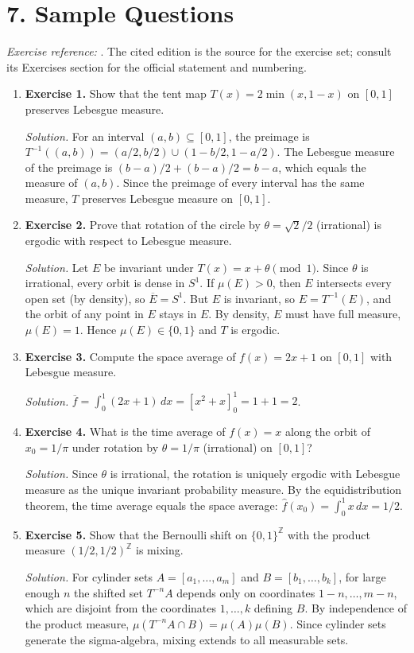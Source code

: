\section*{7. Sample Questions}
\emph{Exercise reference:} \cite{ergodic_theory_ref1}. The cited edition is the source for the exercise set; consult its Exercises section for the official statement and numbering.
\begin{enumerate}[leftmargin=*,itemsep=0.9em]

\item \textbf{Exercise 1.} Show that the tent map $T(x)=2\min(x,1-x)$ on $[0,1]$ preserves Lebesgue measure.

\emph{Solution.} For an interval $(a,b)\subseteq[0,1]$, the preimage is $T^{-1}((a,b))=(a/2,b/2)\cup(1-b/2,1-a/2)$. The Lebesgue measure of the preimage is $(b-a)/2+(b-a)/2=b-a$, which equals the measure of $(a,b)$. Since the preimage of every interval has the same measure, $T$ preserves Lebesgue measure on $[0,1]$.

\item \textbf{Exercise 2.} Prove that rotation of the circle by $\theta=\sqrt{2}/2$ (irrational) is ergodic with respect to Lebesgue measure.

\emph{Solution.} Let $E$ be invariant under $T(x)=x+\theta\pmod{1}$. Since $\theta$ is irrational, every orbit is dense in $S^1$. If $\mu(E)>0$, then $E$ intersects every open set (by density), so $\overline{E}=S^1$. But $E$ is invariant, so $E=T^{-1}(E)$, and the orbit of any point in $E$ stays in $E$. By density, $E$ must have full measure, $\mu(E)=1$. Hence $\mu(E)\in\{0,1\}$ and $T$ is ergodic.

\item \textbf{Exercise 3.} Compute the space average of $f(x)=2x+1$ on $[0,1]$ with Lebesgue measure.

\emph{Solution.} $\overline f=\int_0^1(2x+1)\,dx=[x^2+x]_0^1=1+1=2$.

\item \textbf{Exercise 4.} What is the time average of $f(x)=x$ along the orbit of $x_0=1/\pi$ under rotation by $\theta=1/\pi$ (irrational) on $[0,1]$?

\emph{Solution.} Since $\theta$ is irrational, the rotation is uniquely ergodic with Lebesgue measure as the unique invariant probability measure. By the equidistribution theorem, the time average equals the space average: $\hat f(x_0)=\int_0^1 x\,dx=1/2$.

\item \textbf{Exercise 5.} Show that the Bernoulli shift on $\{0,1\}^{\mathbb Z}$ with the product measure $(1/2,1/2)^{\mathbb Z}$ is mixing.

\emph{Solution.} For cylinder sets $A=[a_1,\ldots,a_m]$ and $B=[b_1,\ldots,b_k]$, for large enough $n$ the shifted set $T^{-n}A$ depends only on coordinates $1-n,\ldots,m-n$, which are disjoint from the coordinates $1,\ldots,k$ defining $B$. By independence of the product measure, $\mu(T^{-n}A\cap B)=\mu(A)\mu(B)$. Since cylinder sets generate the sigma-algebra, mixing extends to all measurable sets.

\end{enumerate}
